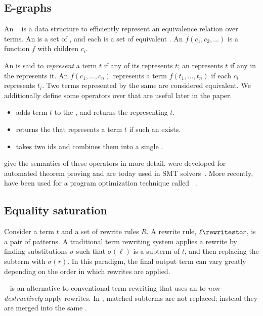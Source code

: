 \subsection{E-graphs}
\label{sec:bg-egraphs}

An \egraph~\citep{nelson, kozen} is a data structure
 to efficiently represent an equivalence relation over terms.
An \egraph is a set of \emph{\eclasses},
 and each \eclass is a set of equivalent \emph{\enodes}.
An \enode $f(c_1, c_2, ...)$ is a function $f$ with children \eclasses $c_i$.

An \egraph is said to \emph{represent} a term $t$
 if any of its \eclasses represents $t$;
 an \eclass represents $t$
 if any \enode in the \eclass represents it.
An \enode $f(c_1,\ldots, c_n)$
 represents a term $f(t_1,\ldots, t_n)$
 if each $c_i$ represents $t_i$.
Two terms represented by the same \eclass
 are considered equivalent.
We additionally define some operators over
  \egraphs that are useful later in the paper.
\begin{itemize}
  \item {} 
  adds term $t$ to the \egraph,
  and returns the \eclass representing $t$.
\item {} returns
  the \eclass that represents a term $t$ if such an \eclass exists.
\item {} takes two \eclass ids
 and combines them into a single \eclass.
\end{itemize}
\citet{egg} give the semantics of these operators in more detail.
\Egraphs were developed for automated theorem proving
 and are today used in SMT solvers~\citep{cvc4, z3}.
More recently, \egraphs have been used
 for a program optimization technique called \eqsat~\citep{eqsat, egg}.

\subsection{Equality saturation}

Consider a term $t$ and a set of rewrite rules $R$.
A rewrite rule, $\ell \rewritesto r$, is
  a pair of patterns.
A traditional term rewriting system
 applies a rewrite
 by finding substitutions $\sigma$ such that $\sigma(\ell)$ is a subterm of $t$,
 and then replacing the subterm with $\sigma(r)$.
In this paradigm, the final output term can vary greatly depending
 on the order in which rewrites are applied.

\Eqsat~\citep{eqsat,egg} is an alternative to conventional
 term rewriting
 that uses an \egraph to \emph{non-destructively} apply rewrites.
In \eqsat, matched
  subterms are not replaced; instead they are merged into the same \eclass.

